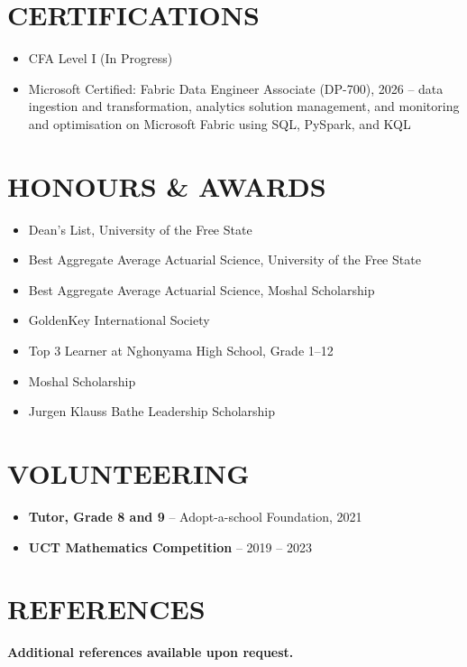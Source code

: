 \documentclass[letterpaper,11pt]{article}
\newcommand{\resumeItem}[1]{
  \item\small{
    {#1 \vspace{-1pt}}
  }
}
\newcommand{\resumeItemListStart}{\begin{itemize}[leftmargin=0.1in]}
\newcommand{\resumeItemListEnd}{\end{itemize}\vspace{-5pt}}
\begin{document}
\section{CERTIFICATIONS}
\vspace{4pt}
\resumeItemListStart
    \resumeItem{\normalsize{CFA Level I (In Progress)}}
    \vspace{-3pt}
    \resumeItem{\normalsize{Microsoft Certified: Fabric Data Engineer Associate (DP-700), 2026 -- data ingestion and transformation, analytics solution management, and monitoring and optimisation on Microsoft Fabric using SQL, PySpark, and KQL}}
\resumeItemListEnd
\vspace{-4pt}

\section{HONOURS \& AWARDS}
\vspace{4pt}
  \resumeItemListStart
    \resumeItem{\normalsize{Dean's List, University of the Free State}}
    \vspace{-3pt}
    \resumeItem{\normalsize{Best Aggregate Average Actuarial Science, University of the Free State}}
    \vspace{-3pt}
    \resumeItem{\normalsize{Best Aggregate Average Actuarial Science, Moshal Scholarship}}
    \vspace{-3pt}
    \resumeItem{\normalsize{GoldenKey International Society}}
    \vspace{-3pt}
    \resumeItem{\normalsize{Top 3 Learner at Nghonyama High School, Grade 1--12}}
    \vspace{-3pt}
    \resumeItem{\normalsize{Moshal Scholarship}}
    \vspace{-3pt}
    \resumeItem{\normalsize{Jurgen Klauss Bathe Leadership Scholarship}}
  \resumeItemListEnd

\vspace{-4pt}

\section{VOLUNTEERING}
\vspace{4pt}
      \resumeItemListStart
        \resumeItem{\normalsize{\textbf{Tutor, Grade 8 and 9} -- Adopt-a-school Foundation, {2021}}}
        \vspace{-3pt}

        \resumeItem{\normalsize{\textbf{UCT Mathematics Competition} -- {2019 -- 2023}}}
      \resumeItemListEnd

\vspace{-4pt}

\section{REFERENCES}
\vspace{4pt}
     \vspace{2pt}
     \textbf{\normalsize{Additional references available upon request.}}
\end{document}
